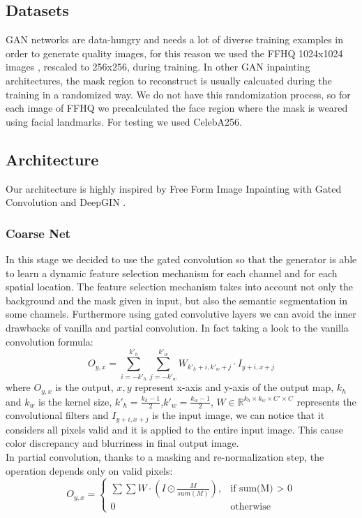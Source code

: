 \documentclass[10pt,twocolumn,letterpaper]{article}
\begin{document}
	\subsection{Datasets}
	GAN networks are data-hungry and needs a lot of diverse training examples in
	order to generate quality images, for this reason we used the FFHQ 1024x1024
	images \cite{karras2019style}, rescaled to 256x256, during training.  In other GAN inpainting
	architectures, the mask region to reconstruct is usually calcuated during the
	training in a randomized way.  We do not have this randomization process, so for
	each image of FFHQ we precalculated the face region where the mask is weared
	using facial landmarks.  For testing we used CelebA256.
	
	\subsection{Architecture}
	Our architecture is highly inspired by Free Form Image Inpainting with Gated
	Convolution \cite{yu2019free} and DeepGIN \cite{li2020deepgin}.
	\subsubsection{Coarse Net}
	In this stage we decided to use the gated convolution so that the generator is able to learn a dynamic feature selection mechanism for each channel and for each spatial location. The feature selection mechanism takes into account not only the background and the mask given in input, but also the semantic segmentation in some channels.
	Furthermore using gated convolutive layers we can avoid the inner drawbacks of vanilla and partial convolution. In fact taking a look to the vanilla convolution formula:
	\begin{equation}
		O_{y,x} = \sum_{i=-k'_h}^{k'_h}\sum_{j=-k'_w}^{k'_w} W_{k'_h + i, k'_w + j} \cdot I_{y + i, x + j}
	\end{equation}
	where \(O_{y,x}\) is the output, \(x,y\) represent x-axis and y-axis of the output map, \(k_h\) and \(k_w\) is the kernel size, \(k'_h = \frac{k_h - 1}{2}\),\(k'_w = \frac{k_w - 1}{2}\), \(W \in \mathbb{R}^{k_h \times k_w \times C' \times C}\) represents the convolutional filters and \(I_{y + i, x + j}\) is the input image, we can notice that it considers all pixels valid and it is applied to the entire input image. This cause color discrepancy and blurriness in final output image.
	\\
	In partial convolution, thanks to a masking and re-normalization step, the operation depends only on valid pixels:
	\begin{equation}
		O_{y,x} = \begin{cases}
			\sum \sum W \cdot (I \odot \frac{M}{sum(M)}), & \text{if sum(M) \(>\) 0} \\ 0 & \text{otherwise}
		\end{cases}
	\end{equation}
	
\end{document}
